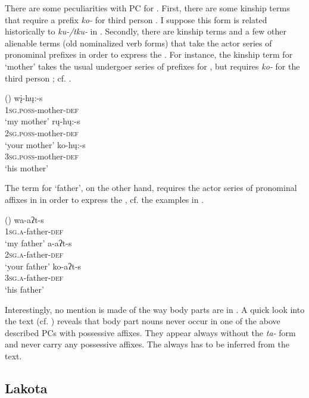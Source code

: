 \documentclass[output=paper]{LSP/langsci}
\begin{document}
There are some peculiarities with PC for . First, there are some kinship terms that require a prefix \textit{ko-} for third person . I suppose this form is related historically to \textit{ku-/tku-} in . Secondly, there are kinship terms and a few other alienable terms (old nominalized verb forms) that take the actor series of pronominal prefixes in order to express the . For instance, the kinship term for `mother' takes the usual undergoer series of prefixes for , but requires \textit{ko-} for the third person ; cf. . 

\ea {} (\citealt[45]{Mixco1997a}) \label{mandanmother}
\ea
\gll wį-hų:-s \\			
\textsc{1sg.poss}-mother-\textsc{def} \\
\glt `my mother'
\ex \gll rų-hų:-s \\
\textsc{2sg.poss}-mother-\textsc{def} \\
\glt `your mother'
\ex \gll ko-hų:-s \\
\textsc{3sg.poss}-mother-\textsc{def} \\
\glt `his mother'
\z \z

The term for `father', on the other hand, requires the actor series of pronominal affixes in  in order to express the , cf. the examples in .

\ea {} (\citealt[45]{Mixco1997a}) \label{mandanfather}
\ea \gll wa-aʔt-s \\
\textsc{1sg.a}-father-\textsc{def} \\
\glt `my father'
\ex \gll a-aʔt-s \\
\textsc{2sg.a}-father-\textsc{def} \\
\glt `your father'
\ex \gll ko-aʔt-s \\
\textsc{3sg.a}-father-\textsc{def} \\
\glt `his father'
\z \z

Interestingly, no mention is made of the way body parts are  in . A quick look into the  text (cf. \citealt[66ff]{Mixco1997a}) reveals that body part nouns never occur in one of the above described PCs with possessive affixes. They appear always without the \textit{ta-} form and never carry any possessive affixes. The  always has to be inferred from the text.
 
\subsection{Lakota}\label{sec:helmbrecht:4.4} \label{lakota} 
\end{document}
